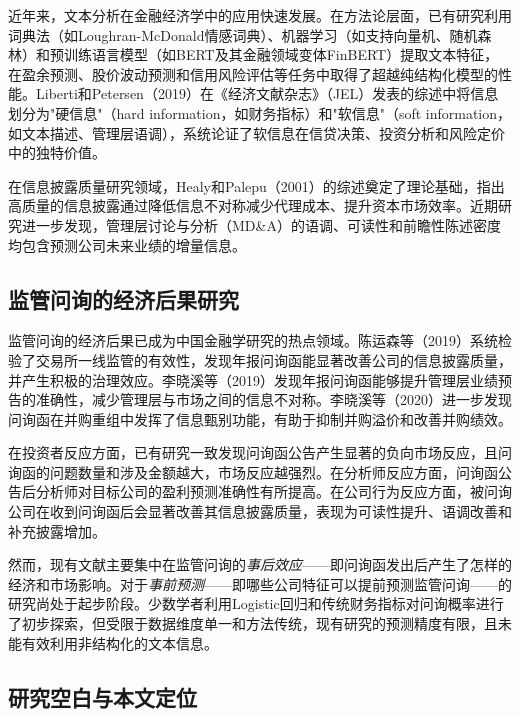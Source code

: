 近年来，文本分析在金融经济学中的应用快速发展。在方法论层面，已有研究利用词典法（如Loughran-McDonald情感词典）、机器学习（如支持向量机、随机森林）和预训练语言模型（如BERT及其金融领域变体FinBERT）提取文本特征，在盈余预测、股价波动预测和信用风险评估等任务中取得了超越纯结构化模型的性能\citep{loughran2011liability,huang2023finbert}。Liberti和Petersen（2019）在《经济文献杂志》（JEL）发表的综述中将信息划分为"硬信息"（hard information，如财务指标）和"软信息"（soft information，如文本描述、管理层语调），系统论证了软信息在信贷决策、投资分析和风险定价中的独特价值\citep{liberti2019information}。

在信息披露质量研究领域，Healy和Palepu（2001）的综述奠定了理论基础，指出高质量的信息披露通过降低信息不对称减少代理成本、提升资本市场效率\citep{healy2001information}。近期研究进一步发现，管理层讨论与分析（MD\&A）的语调\citep{davis2015managerial}、可读性\citep{li2008readability}和前瞻性陈述密度\citep{muslu2015forward}均包含预测公司未来业绩的增量信息。

\subsection{监管问询的经济后果研究}

监管问询的经济后果已成为中国金融学研究的热点领域。陈运森等（2019）系统检验了交易所一线监管的有效性，发现年报问询函能显著改善公司的信息披露质量，并产生积极的治理效应\citep{chen2019supervision}。李晓溪等（2019）发现年报问询函能够提升管理层业绩预告的准确性，减少管理层与市场之间的信息不对称\citep{li2019inquiry}。李晓溪等（2020）进一步发现问询函在并购重组中发挥了信息甄别功能，有助于抑制并购溢价和改善并购绩效\citep{li2020ma}。

在投资者反应方面，已有研究一致发现问询函公告产生显著的负向市场反应\citep{chen2019effective}，且问询函的问题数量和涉及金额越大，市场反应越强烈。在分析师反应方面，问询函公告后分析师对目标公司的盈利预测准确性有所提高\citep{wang2019analyst}。在公司行为反应方面，被问询公司在收到问询函后会显著改善其信息披露质量，表现为可读性提升、语调改善和补充披露增加\citep{li2019inquiry}。

然而，现有文献主要集中在监管问询的\textit{事后效应}——即问询函发出后产生了怎样的经济和市场影响。对于\textit{事前预测}——即哪些公司特征可以提前预测监管问询——的研究尚处于起步阶段。少数学者利用Logistic回归和传统财务指标对问询概率进行了初步探索\citep{cassell2013review}，但受限于数据维度单一和方法传统，现有研究的预测精度有限，且未能有效利用非结构化的文本信息。

\subsection{研究空白与本文定位}

